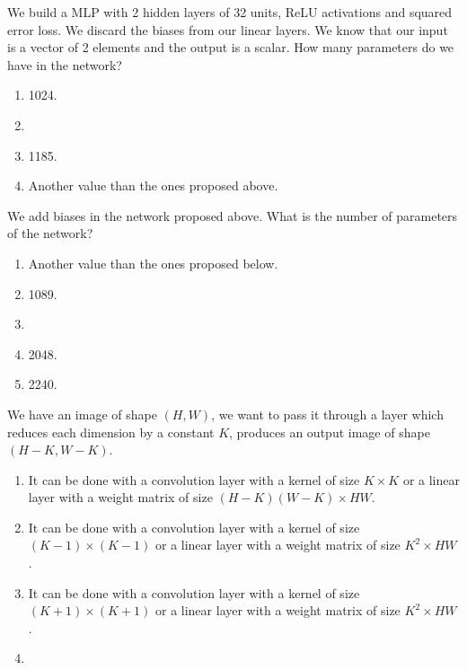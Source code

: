\documentclass[11pt, a4paper]{exam}
\begin{document}
\begin{quiz}
    \item We build a MLP with 2 hidden layers of 32 units, ReLU activations and squared error loss. We discard the biases from our linear layers. We know that our input is a vector of 2 elements and the output is a scalar. How many parameters do we have in the network?
    \begin{enumerate}[label=$\bigcirc$]
        \item 1024.
        \item {}
        \item 1185.
        \item Another value than the ones proposed above.
    \end{enumerate}

    \item We add biases in the network proposed above. What is the number of parameters of the network?
    \begin{enumerate}[label=$\bigcirc$]
        \item Another value than the ones proposed below.
        \item 1089.
        \item {}
        \item 2048.
        \item 2240.
    \end{enumerate}

    \item We have an image of shape $(H, W)$, we want to pass it through a layer which reduces each dimension by a constant $K$, \ie{} produces an output image of shape $(H-K, W-K)$.
    \begin{enumerate}[label=$\bigcirc$]
        \item It can be done with a convolution layer with a kernel of size $K \times K$ or a linear layer with a weight matrix of size $(H-K)(W-K) \times HW$.
        \item It can be done with a convolution layer with a kernel of size $(K - 1) \times (K - 1)$ or a linear layer with a weight matrix of size $K^2 \times HW$.
        \item It can be done with a convolution layer with a kernel of size $(K + 1) \times (K + 1)$ or a linear layer with a weight matrix of size $K^2 \times HW$.
        \item {}
    \end{enumerate}


\end{quiz}
\end{document}
